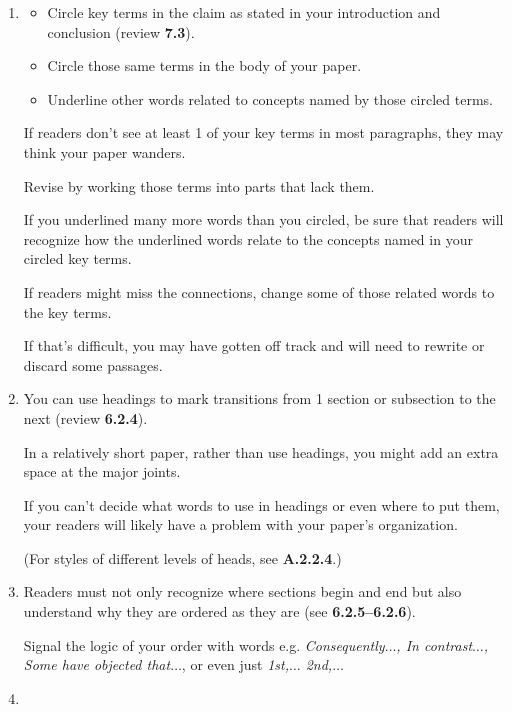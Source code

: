 \documentclass[oneside]{book}
\numberwithin{equation}{section}
\begin{document}
\begin{enumerate}
    \item {}
    \begin{itemize}
        \item Circle key terms in the claim as stated in your introduction and conclusion (review \textbf{7.3}).
        \item Circle those same terms in the body of your paper.
        \item Underline other words related to concepts named by those circled terms.
    \end{itemize}
    If readers don't see at least 1 of your key terms in most paragraphs, they may think your paper wanders.
    
    Revise by working those terms into parts that lack them.
    
    If you underlined many more words than you circled, be sure that readers will recognize how the underlined words relate to the concepts named in your circled key terms.
    
    If readers might miss the connections, change some of those related words to the key terms.

    If that's difficult, you may have gotten off track and will need to rewrite or discard some passages.
    \item {}
    
    You can use headings to mark transitions from 1 section or subsection to the next (review \textbf{6.2.4}).
    
    In a relatively short paper, rather than use headings, you might add an extra space at the major joints.
    
    If you can't decide what words to use in headings or even where to put them, your readers will likely have a problem with your paper's organization.
    
    (For styles of different levels of heads, see \textbf{A.2.2.4}.)
    \item {}
    
    Readers must not only recognize where sections begin and end but also understand why they are ordered as they are (see \textbf{6.2.5--6.2.6}).
    
    Signal the logic of your order with words e.g. \textit{Consequently$\ldots$, In contrast$\ldots$, Some have objected that$\ldots$}, or even just \textit{1st,$\ldots$ 2nd,$\ldots$}
    \item {}
    

\end{enumerate}
\end{document}

